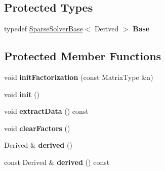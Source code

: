 \subsection*{Protected Types}
\begin{DoxyCompactItemize}
\item 
\mbox{\label{class_eigen_1_1_super_l_u_base_a5e89915a44120a3e63c22143b2ce847e}} 
typedef \mbox{\hyperlink{class_eigen_1_1_sparse_solver_base}{Sparse\+Solver\+Base}}$<$ Derived $>$ {\bfseries Base}
\end{DoxyCompactItemize}
\subsection*{Protected Member Functions}
\begin{DoxyCompactItemize}
\item 
\mbox{\label{class_eigen_1_1_super_l_u_base_a3665a6637d5a7f367237b82c8bfec851}} 
void {\bfseries init\+Factorization} (const Matrix\+Type \&a)
\item 
\mbox{\label{class_eigen_1_1_super_l_u_base_a4a4929ff39e85af22a96f7509ab2bb82}} 
void {\bfseries init} ()
\item 
\mbox{\label{class_eigen_1_1_super_l_u_base_a0a163728356b4dcca91e4ed7124e6f8e}} 
void {\bfseries extract\+Data} () const
\item 
\mbox{\label{class_eigen_1_1_super_l_u_base_a6a3ab89de6a4b9091ac6494d860967bd}} 
void {\bfseries clear\+Factors} ()
\item 
\mbox{\label{class_eigen_1_1_super_l_u_base_ad213fb2c2199ca597b96f1f79653637f}} 
Derived \& {\bfseries derived} ()
\item 
\mbox{\label{class_eigen_1_1_super_l_u_base_af5f23a7e048060c3082c5a1ddfa91932}} 
const Derived \& {\bfseries derived} () const
\end{DoxyCompactItemize}
